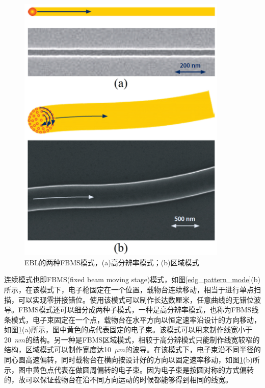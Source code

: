 \begin{figure}[htb]
	\centering
	\includegraphics[width=10cm]{./Pictures/edg_fbms.jpg}
	\captionsetup{justification=centering}
	\caption{EBL的两种FBMS模式，(a)高分辨率模式；(b)区域模式}
	\label{edg_fbms}
\end{figure}

连续模式也即FBMS(fixed beam moving stage)模式，如图\ref{edg_pattern_mode}(b)所示，在该模式下，电子枪固定在一个位置，载物台连续移动，相当于进行单点扫描，可以实现零拼接错位。使用该模式可以制作长达数厘米，任意曲线的无错位波导。FBMS模式还可以细分成两种子模式，一种是高分辨率模式，也称为FBMS线条模式，电子束固定在一个点，载物台在水平方向以恒定速率沿设计的方向移动，如图\ref{edg_fbms}(a)所示，图中黄色的点代表固定的电子束。该模式可以用来制作线宽小于20~$nm$的结构。另一种是FBMS区域模式，相较于高分辨模式只能制作线宽较窄的结构，区域模式可以制作宽度达10~$\mu m$的波导。在该模式下，电子束沿不同半径的同心圆高速偏转，同时载物台在横向按设计好的方向以固定速率移动，如图\ref{edg_fbms}(b)所示，图中黄色点代表在做圆周偏转的电子束。因为电子束是按圆对称的方式偏转的，故可以保证载物台在沿不同方向运动的时候都能够得到相同的线宽。


